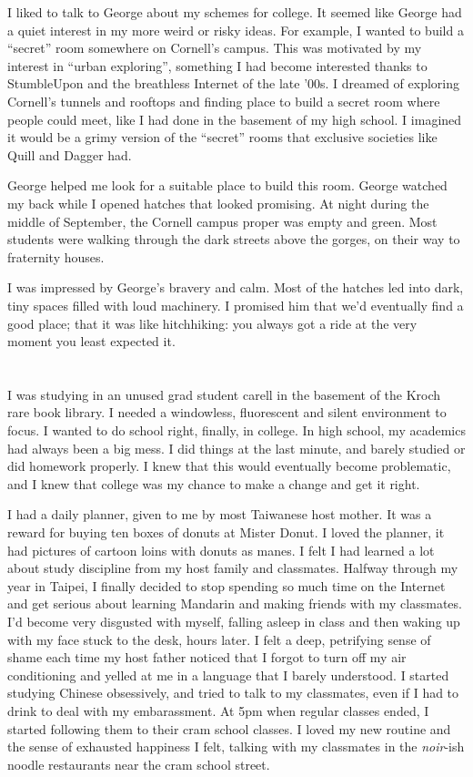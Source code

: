 I liked to talk to George about my schemes for college.  It seemed like George
had a quiet interest in my more weird or risky ideas.  For example, I wanted to
build a ``secret'' room somewhere on Cornell's campus.  This was motivated by my
interest in ``urban exploring'', something I had become interested thanks to
StumbleUpon and the breathless Internet of the late '00s.  I dreamed of
exploring Cornell's tunnels and rooftops and finding place to build a secret
room where people could meet, like I had done in the basement of my high school.
I imagined it would be a grimy version of the ``secret'' rooms that exclusive
societies like Quill and Dagger had. 

George helped me look for a suitable place to build this room.  George watched
my back while I opened hatches that looked promising.  At night during the
middle of September, the Cornell campus proper was empty and green.  Most students
were walking through the dark streets above the gorges, on their way to
fraternity houses.

I was impressed by George's bravery and calm.  Most of the hatches led into
dark, tiny spaces filled with loud machinery.  I promised him that we'd
eventually find a good place; that it was like hitchhiking: you always got a
ride at the very moment you least expected it.

\section{}

I was studying in an unused grad student carell in the basement of the Kroch
rare book library.  I needed a windowless, fluorescent and silent environment to
focus.  I wanted to do school right, finally, in college.  In high school, my
academics had always been a big mess.  I did things at the last minute, and
barely studied or did homework properly.  I knew that this would eventually
become problematic, and I knew that college was my chance to make a change and
get it right. 


I had a daily planner, given to me by most Taiwanese host mother.  It was a
reward for buying ten boxes of donuts at Mister Donut.  I loved the planner, it
had pictures of cartoon loins with donuts as manes. I felt I had learned a lot
about study discipline from my host family and classmates.  Halfway through my
year in Taipei, I finally decided to stop spending so much time on the Internet
and get serious about learning Mandarin and making friends with my classmates.
I'd become very disgusted with myself, falling asleep in class and then waking
up with my face stuck to the desk, hours later.  I felt a deep, petrifying sense
of shame each time my host father noticed that I forgot to turn off my air
conditioning and yelled at me in a language that I barely understood.  I started
studying Chinese obsessively, and tried to talk to my classmates, even if I had
to drink to deal with my embarassment.  At 5pm when regular classes ended, I
started following them to their cram school classes.  I loved my new routine and
the sense of exhausted happiness I felt, talking with my classmates in the
\textit{noir}-ish noodle restaurants near the cram school street. 

